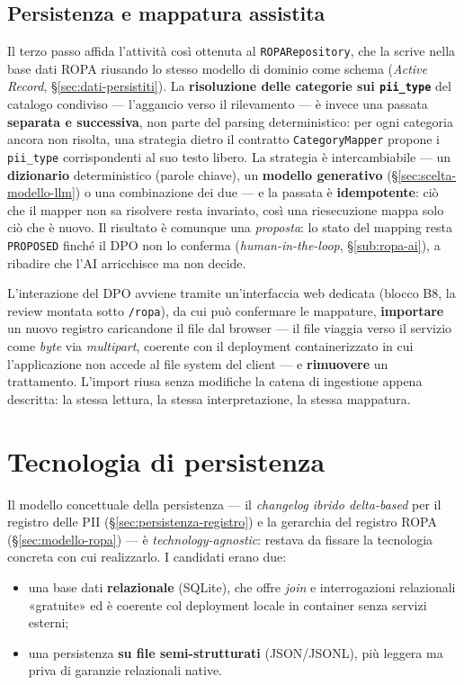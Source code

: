 \subsection{Persistenza e mappatura assistita}
\label{sub:impl-b1-mappatura}

Il terzo passo affida l'attività così ottenuta al \texttt{ROPARepository}, che la scrive nella base dati ROPA riusando lo stesso modello di dominio come schema (\emph{Active Record}, §\ref{sec:dati-persistiti}). La \textbf{risoluzione delle categorie sui \texttt{pii\_type}} del catalogo condiviso --- l'aggancio verso il rilevamento --- è invece una passata \textbf{separata e successiva}, non parte del parsing deterministico: per ogni categoria ancora non risolta, una strategia dietro il contratto \texttt{CategoryMapper} propone i \texttt{pii\_type} corrispondenti al suo testo libero. La strategia è intercambiabile --- un \textbf{dizionario} deterministico (parole chiave), un \textbf{modello generativo} (§\ref{sec:scelta-modello-llm}) o una combinazione dei due --- e la passata è \textbf{idempotente}: ciò che il mapper non sa risolvere resta invariato, così una riesecuzione mappa solo ciò che è nuovo. Il risultato è comunque una \emph{proposta}: lo stato del mapping resta \texttt{PROPOSED} finché il DPO non lo conferma (\emph{human-in-the-loop}, §\ref{sub:ropa-ai}), a ribadire che l'AI arricchisce ma non decide.

L'interazione del DPO avviene tramite un'interfaccia web dedicata (blocco B8, la review montata sotto \texttt{/ropa}), da cui può confermare le mappature, \textbf{importare} un nuovo registro caricandone il file dal browser --- il file viaggia verso il servizio come \emph{byte} via \emph{multipart}, coerente con il deployment containerizzato in cui l'applicazione non accede al file system del client --- e \textbf{rimuovere} un trattamento. L'import riusa senza modifiche la catena di ingestione appena descritta: la stessa lettura, la stessa interpretazione, la stessa mappatura.

\section{Tecnologia di persistenza}
\label{sec:implementazione-persistenza-tecnologia}

Il modello concettuale della persistenza --- il \textit{changelog ibrido delta-based} per il registro delle PII (§\ref{sec:persistenza-registro}) e la gerarchia del registro ROPA (§\ref{sec:modello-ropa}) --- è \textit{technology-agnostic}: restava da fissare la tecnologia concreta con cui realizzarlo. I candidati erano due:
\begin{itemize}
	\item una base dati \textbf{relazionale} (SQLite), che offre \textit{join} e interrogazioni relazionali «gratuite» ed è coerente col deployment locale in container senza servizi esterni;
	\item una persistenza \textbf{su file semi-strutturati} (JSON/JSONL), più leggera ma priva di garanzie relazionali native.
\end{itemize}

